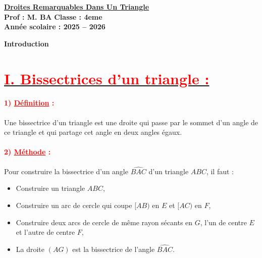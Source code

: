 \documentclass[12pt,a4paper]{article}
\begin{document}
\begin{center}
    \Large\textbf{\underline{Droites Remarquables Dans Un Triangle}}\\[0.2cm]
    \normalsize\textbf{Prof : M. BA} \hfill \textbf{Classe : 4eme}\\[0.1cm]
    \textbf{Année scolaire : 2025 -- 2026}
\end{center}

\begin{center}
\textbf{Introduction}
\end{center}



\section*{\underline{\textbf{\textcolor{red}{I. Bissectrices d’un triangle :}}}}

\paragraph{\textcolor{red}{1) \underline{Définition} :}}
Une bissectrice d'un triangle est une droite qui passe par le sommet d'un angle de ce triangle et qui partage cet angle en deux angles égaux.

\paragraph{\textcolor{red}{2) \underline{Méthode} :}}

Pour construire la bissectrice d'un angle $\widehat{BAC}$ d'un triangle $ABC$, il faut :
\begin{itemize}
    \item[$\checkmark$] Construire un triangle $ABC$,
    \item[$\checkmark$] Construire un arc de cercle qui coupe $[AB)$ en $E$ et $[AC)$ en $F$,
    \item[$\checkmark$] Construire deux arcs de cercle de même rayon sécants en $G$, l'un de centre $E$ et l'autre de centre $F$,
    \item[$\checkmark$] La droite $(AG)$ est la bissectrice de l'angle $\widehat{BAC}$.
\end{itemize}
\end{document}
